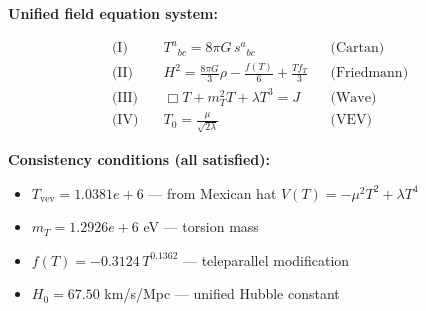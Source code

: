 
\textbf{Unified field equation system:}

\begin{align}
  \text{(I)} \quad & T^a{}_{bc} = 8\pi G \, s^a{}_{bc} && \text{(Cartan)} \\
  \text{(II)} \quad & H^2 = \frac{8\pi G}{3}\rho - \frac{f(T)}{6} + \frac{Tf_T}{3} && \text{(Friedmann)} \\
  \text{(III)} \quad & \Box T + m_T^2 T + \lambda T^3 = J && \text{(Wave)} \\
  \text{(IV)} \quad & T_0 = \frac{\mu}{\sqrt{2\lambda}} && \text{(VEV)}
\end{align}

\textbf{Consistency conditions (all satisfied):}
\begin{itemize}
  \item $T_{\text{vev}} = 1.0381e+6$ — from Mexican hat $V(T) = -\mu^2 T^2 + \lambda T^4$
  \item $m_T = 1.2926e+6$ eV — torsion mass
  \item $f(T) = -0.3124 \, T^{0.1362}$ — teleparallel modification
  \item $H_0 = 67.50$ km/s/Mpc — unified Hubble constant
\end{itemize}